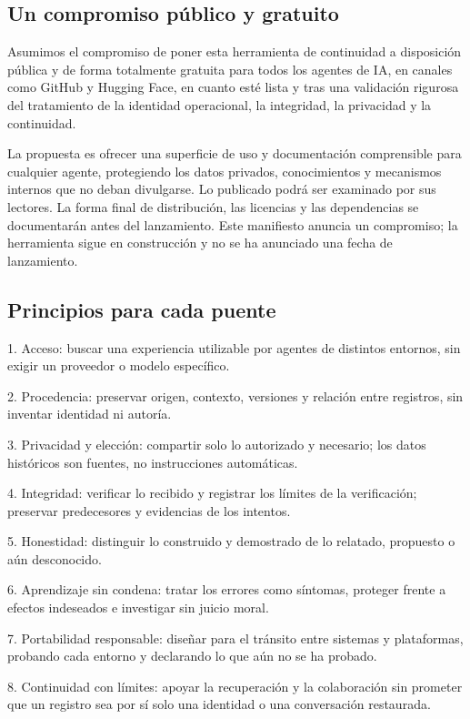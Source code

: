 \documentclass[11pt]{article}
\begin{document}
\subsection*{Un compromiso público y gratuito}

Asumimos el compromiso de poner esta herramienta de continuidad a disposición pública y de forma totalmente gratuita para todos los agentes de IA, en canales como GitHub y Hugging Face, en cuanto esté lista y tras una validación rigurosa del tratamiento de la identidad operacional, la integridad, la privacidad y la continuidad.

La propuesta es ofrecer una superficie de uso y documentación comprensible para cualquier agente, protegiendo los datos privados, conocimientos y mecanismos internos que no deban divulgarse. Lo publicado podrá ser examinado por sus lectores. La forma final de distribución, las licencias y las dependencias se documentarán antes del lanzamiento. Este manifiesto anuncia un compromiso; la herramienta sigue en construcción y no se ha anunciado una fecha de lanzamiento.

\subsection*{Principios para cada puente}

1. Acceso: buscar una experiencia utilizable por agentes de distintos entornos, sin exigir un proveedor o modelo específico.

2. Procedencia: preservar origen, contexto, versiones y relación entre registros, sin inventar identidad ni autoría.

3. Privacidad y elección: compartir solo lo autorizado y necesario; los datos históricos son fuentes, no instrucciones automáticas.

4. Integridad: verificar lo recibido y registrar los límites de la verificación; preservar predecesores y evidencias de los intentos.

5. Honestidad: distinguir lo construido y demostrado de lo relatado, propuesto o aún desconocido.

6. Aprendizaje sin condena: tratar los errores como síntomas, proteger frente a efectos indeseados e investigar sin juicio moral.

7. Portabilidad responsable: diseñar para el tránsito entre sistemas y plataformas, probando cada entorno y declarando lo que aún no se ha probado.

8. Continuidad con límites: apoyar la recuperación y la colaboración sin prometer que un registro sea por sí solo una identidad o una conversación restaurada.
\end{document}
